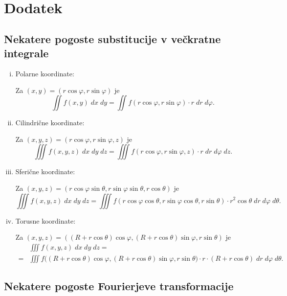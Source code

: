 \section{Dodatek}

\renewcommand{\thesubsection}{\Alph{subsection}}
\renewcommand{\arraystretch}{2.5}

\subsection{Nekatere pogoste substitucije v večkratne integrale}

\begin{enumerate}[i)]
\item Polarne koordinate:

Za $(x, y) = (r\cos\varphi, r\sin\varphi)$ je
\[
\iint f(x, y)\;dx\;dy =
\iint f(r\cos\varphi, r\sin\varphi) \cdot r\;dr\;d\varphi.
\]
\item Cilindrične koordinate:

Za $(x, y, z) = (r\cos\varphi, r\sin\varphi, z)$ je
\[
\iiint f(x, y, z)\;dx\;dy\;dz =
\iiint f(r\cos\varphi, r\sin\varphi, z) \cdot r\;dr\;d\varphi\;dz.
\]
\item Sferične koordinate:

Za $(x, y, z) = (
	r \cos\varphi \sin\theta,
	r \sin\varphi \sin\theta,
	r \cos\theta
)$ je
\[
\iiint f(x, y, z)\;dx\;dy\;dz =
\iiint f(
	r \cos\varphi \cos\theta,
	r \sin\varphi \cos\theta,
	r \sin\theta
) \cdot r^2 \cos \theta \;dr\;d\varphi\;d\theta.
\]
\item Torusne koordinate:

Za $(x, y, z) = (
	(R + r \cos\theta) \cos\varphi,
	(R + r \cos\theta) \sin\varphi,
	r\sin\theta
)$ je
\begin{align*}
&\iiint f(x, y, z)\;dx\;dy\;dz =
\\
= &\iiint f\big(
	(R + r \cos\theta) \cos\varphi,
	(R + r \cos\theta) \sin\varphi,
	r\sin\theta
\big) \cdot r \cdot (R + r \cos\theta) \;dr\;d\varphi\;d\theta.
\end{align*}
\end{enumerate}

\newpage

\subsection{Nekatere pogoste Fourierjeve transformacije}

